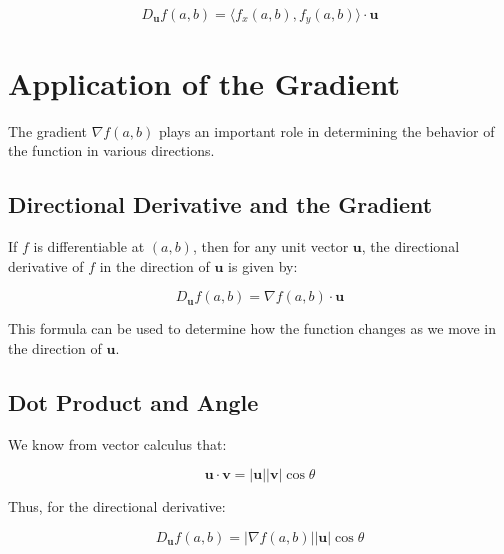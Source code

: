 \documentclass{report}
\begin{document}
\[
	D_{\mathbf{u}} f(a, b) = \langle f_x(a, b), f_y(a, b) \rangle \cdot \mathbf{u}
\]



\section{Application of the Gradient}

The gradient $\nabla f(a, b)$ plays an important role in determining the behavior of the function in various directions.

\subsection{Directional Derivative and the Gradient}

If $f$ is differentiable at $(a, b)$, then for any unit vector $\mathbf{u}$, the directional derivative of $f$ in the direction of $\mathbf{u}$ is given by:

\[
	D_{\mathbf{u}} f(a, b) = \nabla f(a, b) \cdot \mathbf{u}
\]

This formula can be used to determine how the function changes as we move in the direction of $\mathbf{u}$.

\subsection{Dot Product and Angle}

We know from vector calculus that:

\[
	\mathbf{u} \cdot \mathbf{v} = |\mathbf{u}| |\mathbf{v}| \cos \theta
\]

Thus, for the directional derivative:

\[
	D_{\mathbf{u}} f(a, b) = |\nabla f(a, b)| |\mathbf{u}| \cos \theta
\]
\end{document}
